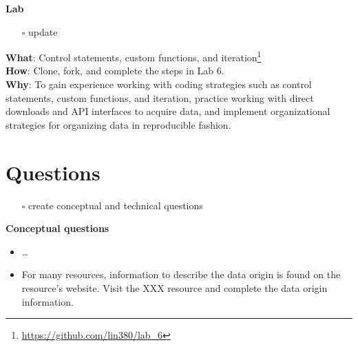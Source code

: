 \documentclass[
  letterpaper,
  DIV=11,
  numbers=noendperiod]{scrreport}
\providecommand{\tightlist}{%
  \setlength{\itemsep}{0pt}\setlength{\parskip}{0pt}}\usepackage{longtable,booktabs,array}
\theoremstyle{definition}
\theoremstyle{remark}
\DeclareRobustCommand{\href}[2]{#2\footnote{\url{#1}}}
\begin{document}
\begin{tcolorbox}[enhanced jigsaw, breakable, arc=.35mm, leftrule=.75mm, rightrule=.15mm, colback=white, toprule=.15mm, bottomrule=.15mm, opacityback=0, left=2mm]

\textbf{ Lab}

\begin{itemize}
\tightlist
\item[$\square$]
   update
\end{itemize}

\textbf{What}: \href{https://github.com/lin380/lab_6}{Control
statements, custom functions, and iteration}\\
\textbf{How}: Clone, fork, and complete the steps in Lab 6.\\
\textbf{Why}: To gain experience working with coding strategies such as
control statements, custom functions, and iteration, practice working
with direct downloads and API interfaces to acquire data, and implement
organizational strategies for organizing data in reproducible fashion.

\end{tcolorbox}

\hypertarget{questions-4}{%
\section*{Questions}\label{questions-4}}


\begin{itemize}
\tightlist
\item[$\square$]
   create conceptual and technical questions
\end{itemize}

\begin{tcolorbox}[enhanced jigsaw, breakable, arc=.35mm, leftrule=.75mm, rightrule=.15mm, colback=white, toprule=.15mm, bottomrule=.15mm, opacityback=0, left=2mm]

\textbf{Conceptual questions}

\begin{itemize}
\tightlist
\item
  \ldots{}
\item
  For many resources, information to describe the data origin is found
  on the resource's website. Visit the XXX resource and complete the
  data origin information.
\end{itemize}

\end{tcolorbox}
\end{document}
